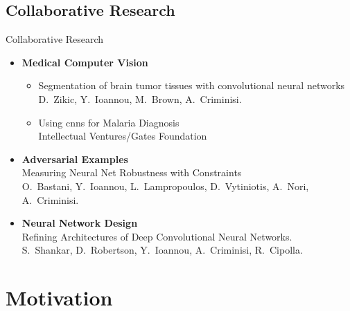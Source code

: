 \documentclass[t,xcolor=dvipsnames]{beamer}
\begin{document}
\subsection{Collaborative Research}
\begin{frame}{Collaborative Research}
\begin{itemize}
    \item \textbf{Medical Computer Vision}
    \begin{itemize}
        \item Segmentation of brain tumor tissues with convolutional neural networks\\{\footnotesize D.\ Zikic, Y.\ Ioannou, M.\ Brown, A.\ Criminisi.}\\%
        \item Using \glspl{cnn} for Malaria Diagnosis\\{\footnotesize Intellectual Ventures/Gates Foundation}
    \end{itemize}
    \item \textbf{Adversarial Examples}\\Measuring Neural Net Robustness with Constraints\\{\footnotesize O.\ Bastani, Y.\ Ioannou, L.\ Lampropoulos, D.\ Vytiniotis, A.\ Nori, A.\ Criminisi.}%
    \item \textbf{Neural Network Design}\\Refining Architectures of Deep Convolutional Neural Networks.\\{\footnotesize 
S.\ Shankar, D.\ Robertson, Y.\ Ioannou, A.\ Criminisi, R.\ Cipolla.}%
\end{itemize}
\end{frame}


\section{Motivation}

\end{document}
